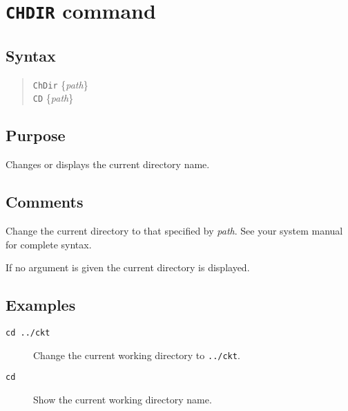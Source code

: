 \section{{\tt CHDIR} command}
\subsection{Syntax}
\begin{verse}
{\tt ChDir} \{{\it path}\}\\
{\tt CD} \{{\it path}\}
\end{verse}
\subsection{Purpose}

Changes or displays the current directory name.
\subsection{Comments}

Change the current directory to that specified by {\it path}.  See your
system manual for complete syntax.

If no argument is given the current directory is displayed.
\subsection{Examples}

\begin{description}

\item[{\tt cd ../ckt}] Change the current working directory to {\tt ../ckt}.

\item[{\tt cd}] Show the current working directory name.

\end{description}
